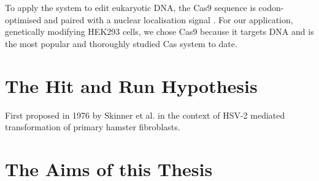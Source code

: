 To apply the system to edit eukaryotic DNA, the Cas9 sequence is codon-optimised and paired with a nuclear localisation signal \cite{maliRNAGuidedHumanGenome2013}. For our application, genetically modifying HEK293 cells, we chose Cas9 because it targets DNA and is the most popular and thoroughly studied Cas system to date. 

\newpage

\section{The Hit and Run Hypothesis}

First proposed in 1976 by Skinner et al. \cite{skinnerTransformationPrimaryHamster1976} in the context of HSV-2 mediated transformation of primary hamster fibroblasts.

\section{The Aims of this Thesis}




